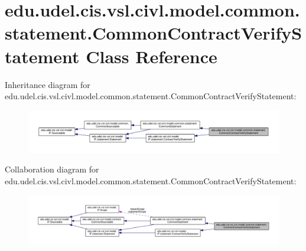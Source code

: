 \hypertarget{classedu_1_1udel_1_1cis_1_1vsl_1_1civl_1_1model_1_1common_1_1statement_1_1CommonContractVerifyStatement}{}\section{edu.\+udel.\+cis.\+vsl.\+civl.\+model.\+common.\+statement.\+Common\+Contract\+Verify\+Statement Class Reference}
\label{classedu_1_1udel_1_1cis_1_1vsl_1_1civl_1_1model_1_1common_1_1statement_1_1CommonContractVerifyStatement}


Inheritance diagram for edu.\+udel.\+cis.\+vsl.\+civl.\+model.\+common.\+statement.\+Common\+Contract\+Verify\+Statement\+:
\nopagebreak
\begin{figure}[H]
\begin{center}
\leavevmode
\includegraphics[width=350pt]{classedu_1_1udel_1_1cis_1_1vsl_1_1civl_1_1model_1_1common_1_1statement_1_1CommonContractVerifyStatement__inherit__graph}
\end{center}
\end{figure}


Collaboration diagram for edu.\+udel.\+cis.\+vsl.\+civl.\+model.\+common.\+statement.\+Common\+Contract\+Verify\+Statement\+:
\nopagebreak
\begin{figure}[H]
\begin{center}
\leavevmode
\includegraphics[width=350pt]{classedu_1_1udel_1_1cis_1_1vsl_1_1civl_1_1model_1_1common_1_1statement_1_1CommonContractVerifyStatement__coll__graph}
\end{center}
\end{figure}
